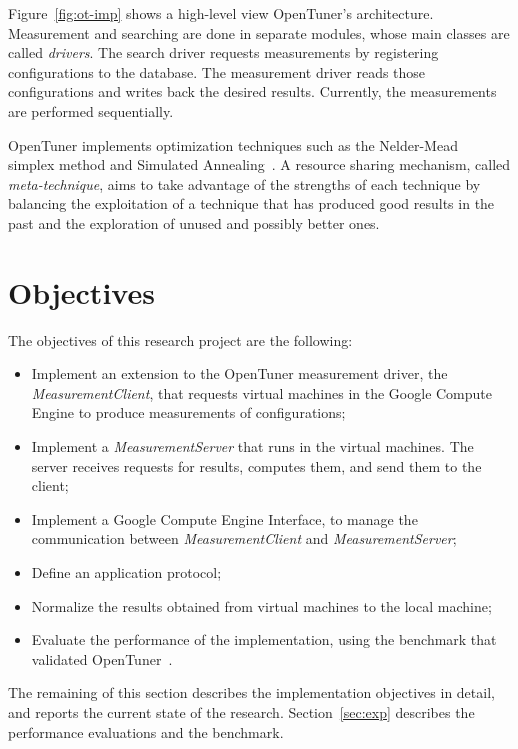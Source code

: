 \documentclass[a4paper, 12pt]{article}
\begin{document}
Figure~\ref{fig:ot-imp} shows a high-level view OpenTuner's architecture.
Measurement and searching are done in separate modules, whose main classes are
called \emph{drivers}. The search driver requests measurements by registering
configurations to the database. The measurement driver reads those
configurations and writes back the desired results.  Currently, the
measurements are performed sequentially.

OpenTuner implements optimization techniques such as the
Nelder-Mead~\cite{nelder1965simplex} simplex method and Simulated
Annealing~\cite{kirkpatrick1983optimization}. A resource sharing mechanism,
called \emph{meta-technique}, aims to take advantage of the strengths of each
technique by balancing the exploitation of a technique that has produced good
results in the past and the exploration of unused and possibly better ones.

\section{Objectives} \label{sec:obj}

The objectives of this research project are the following:

\begin{itemize}
    \item Implement an extension to the OpenTuner measurement driver,
        the \emph{MeasurementClient}, that requests virtual
        machines in the Google Compute Engine to produce
        measurements of configurations;
    \item Implement a \emph{MeasurementServer} that runs
        in the virtual machines. The server receives
        requests for results, computes them, and send
        them to the client;
    \item Implement a Google Compute Engine Interface,
        to manage the communication between \emph{MeasurementClient}
        and \emph{MeasurementServer};
    \item Define an application protocol;
    \item Normalize the results obtained from virtual machines
        to the local machine;
    \item Evaluate the performance of the implementation,
        using the benchmark that validated OpenTuner~\cite{ansel2014opentuner}.
\end{itemize}

The remaining of this section describes the implementation objectives in
detail, and reports the current state of the research. Section~\ref{sec:exp}
describes the performance evaluations and the benchmark.
\end{document}
